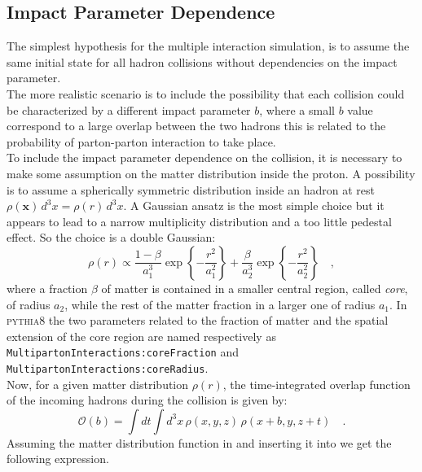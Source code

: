 \subsection{Impact Parameter Dependence}

The simplest hypothesis for the multiple interaction simulation, is to assume the same initial state for all hadron collisions without dependencies on the impact parameter. 
\\
The more realistic scenario is to include the possibility that each collision could be characterized by a different impact parameter $b$, where a small $b$ value correspond to a large overlap between the two hadrons this is related to the probability of parton-parton interaction to take place.
\\
To include the impact parameter dependence on the collision, it is necessary to make some assumption on the matter distribution inside the proton. A possibility is to assume a spherically symmetric distribution inside an hadron at rest $\rho(\mathbf{x})\,d^3x=\rho(r)\,d^3x$. A Gaussian ansatz is the most simple choice but it appears to lead to a narrow multiplicity distribution and a too little pedestal effect. So the choice is a double Gaussian:
\begin{equation}
	\rho(r) \propto \frac{1-\beta}{a_1^3}\exp\left\{-\frac{r^2}{a_1^2}\right\}+\frac{\beta}{a_2^3}\exp\left\{ -\frac{r^2}{a_2^2} \right\}\quad,
	\label{eq:matterDistribution}
\end{equation}
where a fraction $\beta$ of matter is contained in a smaller central region, called \textit{core}, of radius $a_2$, while the rest of the matter fraction in a larger one of radius $a_1$. In \textsc{pythia8} the two parameters related to the fraction of matter and the spatial extension of the core region are named respectively as \texttt{Multiparton}\-\texttt{Interactions:}\-\texttt{core}\-\texttt{Fraction} and \texttt{Multiparton}\-\texttt{Interactions:}\-\texttt{core}\-\texttt{Radius}.
\\
Now, for a given matter distribution $\rho(r)$,  the time-integrated overlap function of the incoming hadrons during the collision is given by:
\begin{equation}
	\mathcal{O}(b)=\displaystyle\int dt \displaystyle\int d^3x\,\rho(x,y,z)\,\rho(x+b,y,z+t)\quad.
	\label{eq:overlappingFunction}
\end{equation} 
Assuming the matter distribution function in  and inserting it into  we get  the following expression.
